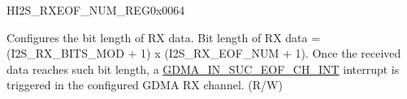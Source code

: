 \begin{register}{H}{I2S\_RXEOF\_NUM\_REG}{0x0064}\label{regdesc:I2SRXEOFNUMREG}
%
%
\regnewline%
\begin{regdesc}\begin{reglist}
\label{fielddesc:I2SRXEOFNUM}\item [I2S\_RX\_EOF\_NUM] Configures the bit length of RX data. Bit length of RX data = (I2S\_RX\_BITS\_MOD + 1) x (I2S\_RX\_EOF\_NUM + 1). Once the received data reaches such bit length, a \hyperref[int:GDMAINSUCEOFINT]{GDMA\_IN\_SUC\_EOF\_CH\_INT} interrupt is triggered in the configured GDMA RX channel. (R/W)
\end{reglist}\end{regdesc}
\end{register}


